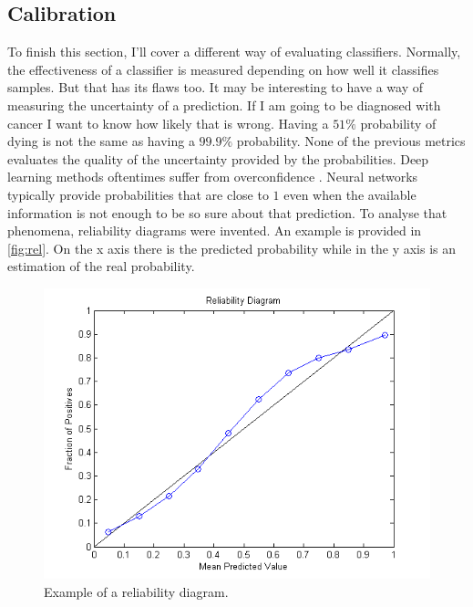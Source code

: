 \subsection{Calibration}

To finish this section, I'll cover a different way of evaluating classifiers. Normally, the effectiveness of a classifier is measured depending on how well it classifies samples. But that has its flaws too. It may be interesting to have a way of measuring the uncertainty of a prediction. If I am going to be diagnosed with cancer I want to know how likely that is wrong. Having a $51\%$ probability of dying is not the same as having a $99.9\%$ probability. None of the previous metrics evaluates the quality of the uncertainty provided by the probabilities. Deep learning methods oftentimes suffer from overconfidence \cite{wei2022mitigating, meronen2023fixing, melotti2022reducing}. Neural networks typically provide probabilities that are close to $1$ even when the available information is not enough to be so sure about that prediction. To analyse that phenomena, reliability diagrams were invented. An example is provided in \autoref{fig:rel}. On the x axis there is the predicted probability while in the y axis is an estimation of the real probability.

\begin{figure}[ht]
    \centering
    \includegraphics[width=\textwidth]{imgs/rel.png}
    \caption{Example of a reliability diagram.}
    \label{fig:rel}
\end{figure}

